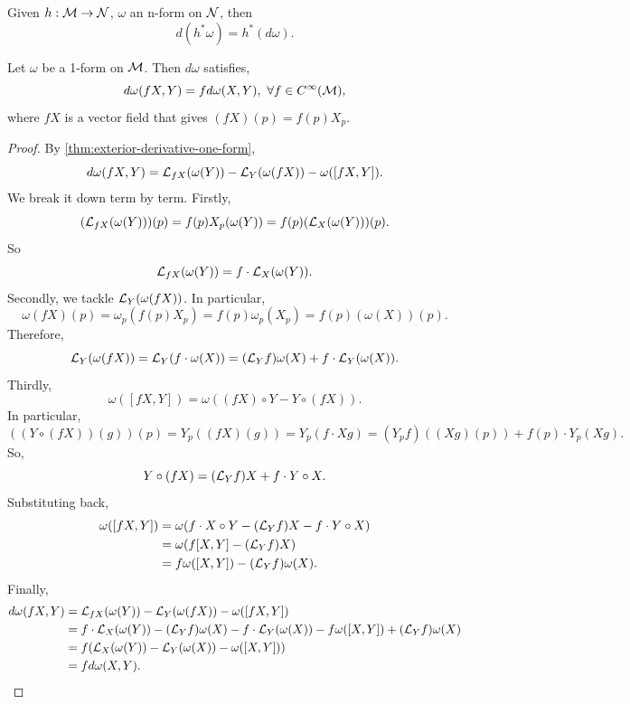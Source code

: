 \documentclass[../main.tex]{subfiles}
\begin{document}
    \begin{theorem}\label{thm:exterior-derivative-pullback}
        Given \(h : \manifold[M] \to \manifold[N]\), \(\omega\) an n-form on 
        \(\manifold[N]\), then 
        \[
        d(h^*\omega) = h^*(d\omega).
        \]
    \end{theorem}
    \begin{theorem}
        \label{thm:f-linear-exterior-derivative}
        Let \(\omega\) be a 1-form on \(\manifold[M]\). Then \(d\omega\) 
        satisfies,
        \[
        d\omega(fX, Y) = fd\omega(X, Y),~\forall f \in C^\infty(\manifold[M]),
        \]
        where \(fX\) is a vector field that gives \((fX)(p) = f(p)X_p\).
    \end{theorem}
    \begin{proof}
        By \cref{thm:exterior-derivative-one-form}, 
        \[
        d\omega(fX, Y) = \lder{fX}(\omega(Y)) - \lder{Y}(\omega(fX)) - 
        \omega([fX, Y]).
        \]
        We break it down term by term. Firstly, 
        \[
        (\lder{fX}(\omega(Y)))(p) = f(p)X_p(\omega(Y)) = 
        f(p)(\lder{X}(\omega(Y)))(p).
        \]
        So
        \[
        \lder{fX}(\omega(Y)) = f\cdot\lder{X}(\omega(Y)).
        \]
        Secondly, we tackle \(\lder{Y}(\omega(fX))\). In particular, 
        \[
        \omega(fX)(p) = \omega_p(f(p)X_p) = f(p) \omega_p(X_p) = 
        f(p)(\omega(X))(p).
        \]
        Therefore, 
        \[
        \lder{Y}(\omega(fX)) = \lder{Y}(f\cdot\omega(X)) = 
        (\lder{Y}f)\omega(X) + f\cdot\lder{Y}(\omega(X)).
        \]
        Thirdly, 
        \[
        \omega([fX, Y]) = \omega((fX)\circ Y - Y \circ (fX)).
        \]
        In particular, 
        \[
        ((Y \circ (fX))(g))(p) = Y_p((fX)(g)) = Y_p(f\cdot Xg)
        = (Y_pf)((Xg)(p)) + f(p)\cdot Y_p(Xg).
        \]
        So, 
        \[
        Y \circ (fX) = (\lder{Y}f)X + f\cdot Y\circ X.
        \]
        Substituting back, 
        \[
        \begin{aligned}
            \omega([fX, Y]) &= \omega(f\cdot X\circ Y - (\lder{Y}f)X - f\cdot Y\circ X) \\
            &= \omega(f[X, Y] - (\lder{Y}f)X) \\
            &= f\omega([X, Y]) - (\lder{Y}f)\omega(X).
        \end{aligned}
        \]
        Finally, 
        \[
        \begin{aligned}
            d\omega(fX, Y) &= \lder{fX}(\omega(Y)) - \lder{Y}(\omega(fX)) - 
            \omega([fX, Y]) \\
            &= f\cdot\lder{X}(\omega(Y)) - (\lder{Y}f)\omega(X) - 
            f\cdot\lder{Y}(\omega(X)) - f\omega([X, Y]) + (\lder{Y}f)\omega(X) \\
            &= f(\lder{X}(\omega(Y)) - \lder{Y}(\omega(X)) - \omega([X, Y])) \\
            &= fd\omega(X, Y).
        \end{aligned}
        \]
    \end{proof}
\end{document}
